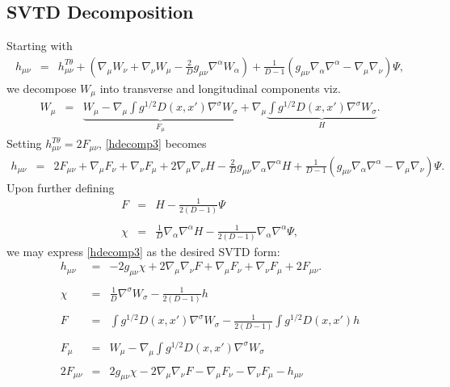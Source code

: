 \documentclass[10pt,letterpaper]{article}
\numberwithin{equation}{section}
\begin{document}
\begin{appendices}
\section{SVTD Decomposition}
%
%
Starting with 
\begin{eqnarray}
h_{\mu\nu} &=& h_{\mu\nu}^{T\theta} + \left(\nabla_\mu W_\nu + \nabla_\nu W_\mu - \frac{2}{D}g_{\mu\nu}\nabla^\alpha W_\alpha\right) +\frac{1}{D-1}\left( g_{\mu\nu}\nabla_\alpha \nabla^\alpha - \nabla_\mu\nabla_\nu\right)\Psi,
\label{hdecomp3}
\end{eqnarray}
we decompose $W_{\mu}$ into transverse and longitudinal components viz.
\begin{eqnarray}
W_{\mu} &=& \underbrace{W_{\mu} -\nabla_\mu \int g^{1/2} D(x,x')\nabla^{\sigma}W_\sigma}_{F_{\mu}} + \nabla_\mu \underbrace{ \int g^{1/2}D(x,x')\nabla^\sigma W_\sigma}_{H}.
\end{eqnarray}
Setting $h_{\mu\nu}^{T\theta} = 2F_{\mu\nu}$, \eqref{hdecomp3} becomes
\begin{eqnarray}
h_{\mu\nu}&=& 2F_{\mu\nu} + \nabla_\mu F_\nu + \nabla_\nu F_\mu + 2 \nabla_\mu\nabla_\nu H - \frac{2}{D}g_{\mu\nu}\nabla_\alpha \nabla^\alpha H +\frac{1}{D-1}\left( g_{\mu\nu}\nabla_\alpha \nabla^\alpha - \nabla_\mu\nabla_\nu\right)\Psi.
\end{eqnarray}
Upon further defining
\begin{eqnarray}
F &=& H - \frac{1}{2(D-1)} \Psi
\\ \nonumber\\
\chi &=& \frac{1}{D}\nabla_\alpha\nabla^\alpha H - \frac{1}{2(D-1)}\nabla_\alpha\nabla^\alpha \Psi,
\end{eqnarray}
we may express \eqref{hdecomp3} as the desired SVTD form:
\begin{eqnarray}
h_{\mu\nu} &=& -2g_{\mu\nu}\chi + 2\nabla_\mu\nabla_\nu F + \nabla_\mu F_\nu + \nabla_\nu F_\mu + 2F_{\mu\nu}.
\\ \nonumber\\
\chi &=& \frac{1}{D}\nabla^\sigma W_{\sigma}  - \frac{1}{2(D-1)}h
\\ \nonumber\\
F &=& \int g^{1/2} D(x,x') \nabla^\sigma W_{\sigma}  - \frac{1}{2(D-1)}\int g^{1/2} D(x,x') h
\\ \nonumber\\
F_{\mu} &=& W_{\mu} -\nabla_\mu \int g^{1/2} D(x,x')\nabla^{\sigma}W_\sigma
\\ \nonumber\\
2F_{\mu\nu} &=& 2g_{\mu\nu}\chi - 2\nabla_\mu\nabla_\nu F - \nabla_\mu F_\nu - \nabla_\nu F_{\mu} - h_{\mu\nu} 

\end{eqnarray}
\end{appendices}
\end{document}
